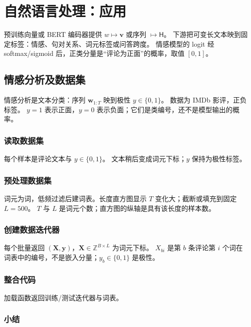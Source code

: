 \chapter{自然语言处理：应用}

预训练向量或 BERT 编码器提供 $w\mapsto\bm{v}$ 或序列 $\mapsto\mathsf{H}$。
下游把可变长文本映到固定标签：情感、句对关系、词元标签或问答跨度。
情感模型的 logit 经 softmax/sigmoid 后，正类分量是“评论为正面”的概率，取值 $[0,1]$。

\section{情感分析及数据集}

情感分析是文本分类：序列 $\bm{w}_{1:T}$ 映到极性 $y\in\{0,1\}$。
数据为 IMDb 影评，正负标签。
$y=1$ 表示正面，$y=0$ 表示负面；它们是类编号，还不是模型输出的概率。

\subsection{读取数据集}

每个样本是评论文本与 $y\in\{0,1\}$。
文本稍后变成词元下标；$y$ 保持为极性标签。

\subsection{预处理数据集}

词元为词，低频过滤后建词表。长度直方图显示 $T$ 变化大；截断或填充到固定 $L=500$。
$T$ 与 $L$ 是词元个数；直方图的纵轴是具有该长度的样本数。

\subsection{创建数据迭代器}

每个批量返回 $(\bm{X},\bm{y})$，$\bm{X}\in\mathbb{Z}^{B\times L}$ 为词元下标。
$X_{bi}$ 是第 $b$ 条评论第 $i$ 个词在词表中的编号，不是嵌入分量；$y_b\in\{0,1\}$ 是极性。

\subsection{整合代码}

加载函数返回训练/测试迭代器与词表。

\subsection{小结}

